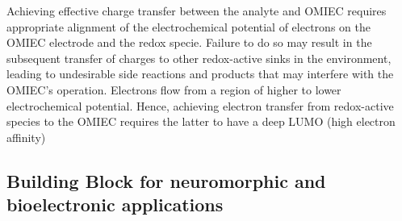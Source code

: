 Achieving effective charge transfer between the analyte and OMIEC requires appropriate alignment of the electrochemical potential of electrons on the OMIEC electrode and the redox specie. Failure to do so may result in the subsequent transfer of charges to other redox-active sinks in the environment, leading to undesirable side reactions and products that may interfere with the OMIEC’s operation. Electrons flow from a region of higher to lower electrochemical potential. Hence, achieving electron transfer from redox-active species to the OMIEC requires the latter to have a deep LUMO (high electron affinity) \cite{tanMixedIonicElectronic2022}


\subsection{Building Block for neuromorphic and bioelectronic applications}

